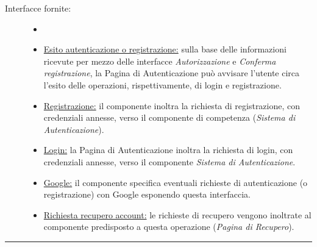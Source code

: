\documentclass[11pt, a4paper]{article}
\theoremstyle{definition} %
\begin{document}
\begin{description}
    \item[Interfacce fornite:]
    \begin{itemize}
        \item[]

        \item \underline{Esito autenticazione o registrazione:} sulla
        base delle informazioni ricevute per mezzo delle interfacce
        \textit{Autorizzazione} e \textit{Conferma registrazione},
        la Pagina di Autenticazione può avvisare l'utente circa
        l'esito delle operazioni, rispettivamente, di login e
        registrazione.

        \item \underline{Registrazione:} il componente inoltra la
        richiesta di registrazione, con credenziali annesse, verso
        il componente di competenza (\textit{Sistema di Autenticazione}).

        \item \underline{Login:} la Pagina di Autenticazione inoltra
        la richiesta di login, con credenziali annesse, verso il
        componente \textit{Sistema di Autenticazione}.

        \item \underline{Google:} il componente specifica eventuali
        richieste di autenticazione (o registrazione) con Google
        esponendo questa interfaccia.

        \item \underline{Richiesta recupero account:} le richieste di
        recupero vengono inoltrate al componente predisposto a questa
        operazione (\textit{Pagina di Recupero}).
    \end{itemize}
\end{description}


\begin{center}
    \rule{5cm}{1pt}
\end{center}
\end{document}
